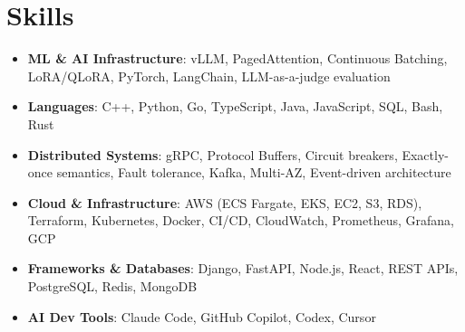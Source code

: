 \documentclass[letterpaper,11pt]{article}
\newcommand{\resumeSubHeadingListStart}{\begin{itemize}[leftmargin=0.15in, label={}]}
\newcommand{\resumeSubHeadingListEnd}{\end{itemize}}
\newcommand{\resumeSkillHeading}[2]{%
  \item\small{\textbf{#1}: #2 \vspace{-9pt}}%
}
\begin{document}
\section{Skills}
  \resumeSubHeadingListStart
    \resumeSkillHeading{ML \& AI Infrastructure}{vLLM, PagedAttention, Continuous Batching, LoRA/QLoRA, PyTorch, LangChain, LLM-as-a-judge evaluation}
    \resumeSkillHeading{Languages}{C++, Python, Go, TypeScript, Java, JavaScript, SQL, Bash, Rust}
    \resumeSkillHeading{Distributed Systems}{gRPC, Protocol Buffers, Circuit breakers, Exactly-once semantics, Fault tolerance, Kafka, Multi-AZ, Event-driven architecture}
    \resumeSkillHeading{Cloud \& Infrastructure}{AWS (ECS Fargate, EKS, EC2, S3, RDS), Terraform, Kubernetes, Docker, CI/CD, CloudWatch, Prometheus, Grafana, GCP}
    \resumeSkillHeading{Frameworks \& Databases}{Django, FastAPI, Node.js, React, REST APIs, PostgreSQL, Redis, MongoDB}
    \resumeSkillHeading{AI Dev Tools}{Claude Code, GitHub Copilot, Codex, Cursor}
  \resumeSubHeadingListEnd
\end{document}
